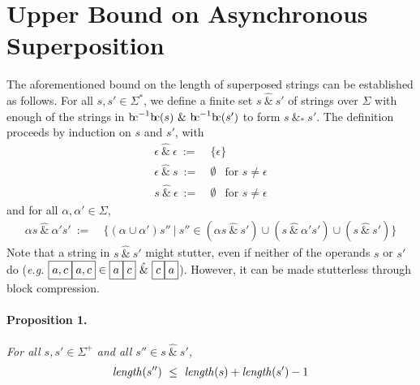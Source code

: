 \documentclass[a4paper,11pt,leqno]{article}
\newcommand{\bc}{{\rm b\!c}}
\newcommand{\vph}[1]{\vphantom{#1}}
\newcommand{\ebox}[1]{\fbox{$\vph{',}#1$}}
\begin{document}
\section{Upper Bound on Asynchronous Superposition}\label{upper}
The aforementioned bound on the length of superposed strings can be established 
as follows.
For all $s,s'\in \Sigma^{\ast}$, we define a finite set
$s~\hat{\&}~s'$ of strings over $\Sigma$ with enough of 
the strings in $\bc^{-1}\bc(s)~\&~\bc^{-1}\bc(s')$
to form $s~\&_*~s'$.
The definition proceeds by induction on $s$ and $s'$, with
\begin{subequations}
\begin{align}
\epsilon\ \hat{\&}\ \epsilon \ :=& \ \{\epsilon\}\\
\epsilon\ \hat{\&}\ s \ :=& \ \emptyset\ \ \mbox{ for } s\neq\epsilon\\
s\ \hat{\&}\ \epsilon \ :=& \ \emptyset\ \ \mbox{ for } s\neq\epsilon
\end{align}
\end{subequations}
and for all $\alpha,\alpha'\in \Sigma$,
\begin{align}
\alpha s~\hat{\&}~\alpha's' \ :=&~\{(\alpha\cup\alpha')s''\ | \ s''\in (\alpha 
s~\hat{\&}~s') \cup 
(s~\hat{\&}~\alpha's') \cup (s~\hat{\&}~s')\}
\end{align}
Note that a string in $s\ \hat{\&}\ s'$ might stutter, even if neither of the 
operands $s$ or $s'$ do
(\textit{e.g.} $\ebox{a,c}\ebox{a,c}\in
\ebox{a}\ebox{c}\ \hat{\&}\ 
\ebox{c}\ebox{a}$). However, it can be made stutterless through block 
compression.
\paragraph{Proposition 1.} {\sl For all  $s, s' \in \Sigma^+$
	and all $s''\in s\ \hat{\&}\ s'$,}
\begin{align}
\mbox{\textit{length}}(s'')\ \leq\ \mbox{\textit{length}}(s) + 
\mbox{\textit{length}}(s') -1
\end{align}
\end{document}
